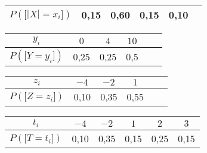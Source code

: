 \documentclass[a4paper, 11pt,reqno]{article}
\begin{document}
\begin{correction}
\begin{enumerate}
\begin{center}
\begin{tabular}{|c|c|c|c|c|c|}
               \hline $P(\lbrack |X|=x_i\rbrack)$ & 0,15 & 0,60 & 0,15 & 0,10
               \\ \hline
			      \end{tabular} %
			      \quad \begin{tabular}{|c|c|c|c|c|c|} \hline $y_i$     & $0$  & $4$  & $10$ \\
               \hline $P(\lbrack Y=y_i\rbrack)$ & 0,25 & 0,25 & 0,5
               \\ \hline
			      \end{tabular} \end{center}
		      \begin{center}
			      \begin{tabular}{|c|c|c|c|c|c|} \hline $z_i$     & $-4$ & $-2$ & $1$  \\
               \hline $P(\lbrack Z=z_i\rbrack)$ & 0,10 & 0,35 & 0,55
               \\ \hline
			      \end{tabular} %
			      \quad \begin{tabular}{|c|c|c|c|c|c|} \hline $t_i$     & $-4$ & $-2$ & $1$  & $2$  & $3$  \\
               \hline $P(\lbrack T=t_i\rbrack)$ & 0,10 & 0,35 & 0,15 & 0,25 & 0,15
               \\ \hline
			      \end{tabular} \end{center}
	\end{enumerate}
\end{correction}
\end{document}
